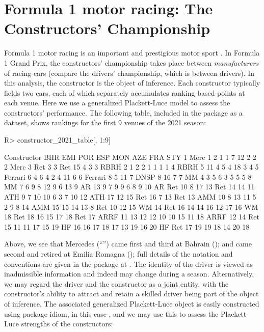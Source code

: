 \documentclass[article]{jss}
\begin{document}
\section{Formula 1 motor racing: The Constructors' Championship}\label{f1}

Formula 1 motor racing is an important and prestigious motor sport
\citep{codling2017,jenkins2010}.  In Formula 1 Grand Prix, the
constructors' championship takes place between {\em manufacturers} of
racing cars (compare the drivers' championship, which is between
drivers).  In this analysis, the constructor is the object of
inference.  Each constructor typically fields two cars, each of which
separately accumulates ranking-based points at each venue.  Here we
use a generalized Plackett-Luce model to assess the constructors'
performance.  The following table, included in the 
package as a dataset, shows rankings for the first 9 venues of the
2021 season:

\begin{Schunk}
\begin{Sinput}
R> constructor_2021_table[, 1:9]
\end{Sinput}
\begin{Soutput}
   Constructor BHR EMI POR ESP  MON AZE FRA STY
1         Merc   1   2   1   1    7  12   2   2
2         Merc   3 Ret   3   3  Ret  15   4   3
3         RBRH   2   1   2   2    1   1   1   1
4         RBRH   5  11   4   5    4  18   3   4
5      Ferrari   6   4   6   4    2   4  11   6
6      Ferrari   8   5  11   7 DNSP   8  16   7
7           MM   4   3   5   6    3   5   5   5
8           MM   7   6   9   8   12   9   6  13
9           AR  13   9   7   9    9   6   8   9
10          AR Ret  10   8  17   13 Ret  14  14
11         ATH   9   7  10  10    6   3   7  10
12         ATH  17  12  15 Ret   16   7  13 Ret
13         AMM  10   8  13  11    5   2   9   8
14         AMM  15  15  14  13    8 Ret  10  12
15          WM  14 Ret  16  14   14  16  12  17
16          WM  18 Ret  18  16   15  17  18 Ret
17        ARRF  11  13  12  12   10  10  15  11
18        ARRF  12  14 Ret  15   11  11  17  15
19          HF  16  16  17  18   17  13  19  16
20          HF Ret  17  19  19   18  14  20  18
\end{Soutput}
\end{Schunk}

Above, we see that Mercedes (``'') came first and third at
Bahrain (); and came second and retired at Emilia Romagna
(); full details of the notation and conventions are given
in the package at .  The identity of the driver
is viewed as inadmissible information and indeed may change during a
season.  Alternatively, we may regard the driver and the constructor
as a joint entity, with the constructor's ability to attract and
retain a skilled driver being part of the object of inference.  The
associated generalized Plackett-Luce  object is easily
constructed using package idiom, in this case
, and we may use this to assess the
Plackett-Luce strengths of the constructors:
\end{document}
